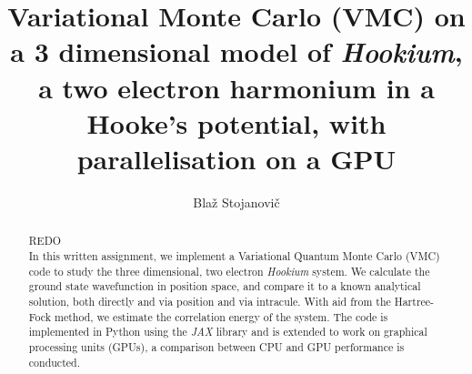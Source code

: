 \documentclass[final,3p,times,twocolumn]{elsarticle}
\begin{document}
	
	\begin{frontmatter}
		
		
		
		\title{Variational Monte Carlo (VMC) on a 3 dimensional model of \emph{Hookium}, a two electron harmonium in a Hooke’s potential, with parallelisation on a GPU}
		
		
		\author{Bla\v z Stojanovi\v c}
		
		\address{Cavendish Laboratory, Department of Physics, J J Thomson
			Avenue, Cambridge. CB3 0HE}
		
		\begin{abstract}
			REDO  \\
			In this written assignment, we implement a Variational Quantum Monte Carlo (VMC) code to study the three dimensional, two electron \emph{Hookium} system. We calculate the ground state wavefunction in position space, and compare it to a known analytical solution, both directly and via position and via intracule. With aid from the Hartree-Fock method, we estimate the correlation energy of the system. The code is implemented in Python using the \emph{JAX} library and is extended to work on graphical processing units (GPUs), a comparison between CPU and GPU performance is conducted. 
		\end{abstract}
		
	\end{frontmatter}
	
	
\end{document}

